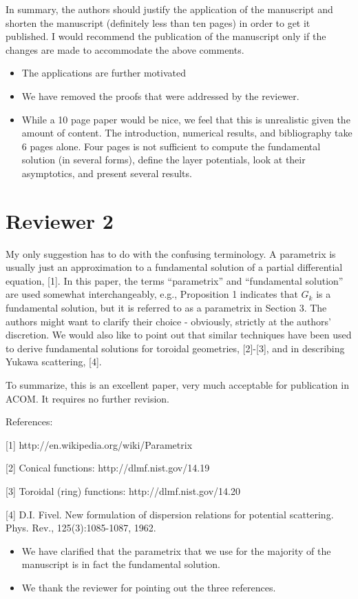 \documentclass[11pt]{article}
\newcommand{\comment}[1]{{\color{blue} #1}}
\begin{document}
\comment{In summary, the authors should justify the application of the
manuscript and shorten the manuscript (definitely less than ten pages)
in order to get it published. I would recommend the publication of the
manuscript only if the changes are made to accommodate the above
comments.}
\begin{itemize}
  \item The applications are further motivated
  \item We have removed the proofs that were addressed by the reviewer.
  \item While a 10 page paper would be nice, we feel that this is
  unrealistic given the amount of content.  The introduction, numerical
  results, and bibliography take 6 pages alone.  Four pages is not
  sufficient to compute the fundamental solution (in several forms),
  define the layer potentials,  look at their asymptotics, and present
  several results.
\end{itemize}



\section*{Reviewer 2}
\comment{My only suggestion
has to do with the confusing terminology. A parametrix is usually just
an approximation to a fundamental solution of a partial differential
equation, [1]. In this paper, the terms ``parametrix'' and
``fundamental solution'' are used somewhat interchangeably, e.g.,
Proposition 1 indicates that $G_k$ is a fundamental solution, but it
is referred to as a parametrix in Section 3. The authors might want to
clarify their choice - obviously, strictly at the authors'
discretion. We would also like to point out that similar techniques
have been used to derive fundamental solutions for toroidal
geometries, [2]-[3], and in describing Yukawa scattering, [4].

To summarize, this is an excellent paper, very much acceptable for
publication in ACOM. It requires no further revision.

References:

[1] http://en.wikipedia.org/wiki/Parametrix

[2] Conical functions: http://dlmf.nist.gov/14.19

[3] Toroidal (ring) functions: http://dlmf.nist.gov/14.20

[4] D.I. Fivel. New formulation of dispersion relations for
potential scattering. Phys. Rev., 125(3):1085-1087, 1962.
}

\begin{itemize}
  \item We have clarified that the parametrix that we use for the
  majority of the manuscript is in fact the fundamental solution.

  \item We thank the reviewer for pointing out the three references.
\end{itemize}
\end{document}
